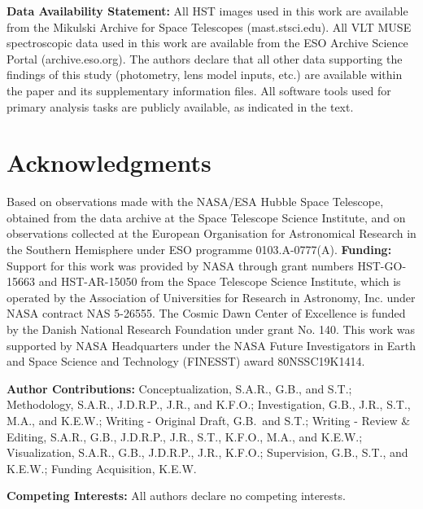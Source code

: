 \documentclass[12pt]{article}
\begin{document}
{\bf Data Availability Statement:} All HST images used in this work are available from the Mikulski Archive for Space Telescopes (mast.stsci.edu). All VLT MUSE spectroscopic data used in this work are available from  the ESO Archive Science Portal (archive.eso.org). The authors declare that all other data supporting the findings of this study (photometry, lens model inputs, etc.) are available within the paper and its supplementary information files.  All software tools used for primary analysis tasks are publicly available, as indicated in the text.


\section*{Acknowledgments}

Based on observations made with the NASA/ESA Hubble Space Telescope, obtained from the data archive at the Space Telescope Science Institute, and on observations collected at the European Organisation for Astronomical Research in the Southern Hemisphere under ESO programme 0103.A-0777(A).  
{\bf Funding:} Support for this work was provided by NASA through grant numbers HST-GO-15663 and HST-AR-15050 from the Space Telescope Science Institute, which is operated by the Association of Universities for Research in Astronomy, Inc. under NASA contract NAS 5-26555.  The Cosmic Dawn Center of Excellence is funded by the Danish National Research Foundation under grant No. 140. This work was supported by NASA Headquarters under the NASA Future Investigators in Earth and Space Science and Technology (FINESST) award 80NSSC19K1414. 

{\bf Author Contributions:} 
Conceptualization, S.A.R., G.B., and S.T.; Methodology, S.A.R., J.D.R.P., J.R., and K.F.O.; Investigation, G.B., J.R., S.T., M.A., and K.E.W.; Writing - Original Draft, G.B.\ and S.T.; Writing - Review \& Editing, S.A.R., G.B., J.D.R.P., J.R., S.T., K.F.O., M.A., and K.E.W.; Visualization, S.A.R., G.B., J.D.R.P., J.R., K.F.O.; Supervision, G.B., S.T., and K.E.W.; Funding Acquisition, K.E.W.

{\bf Competing Interests:} All authors declare no competing interests.
\end{document}
